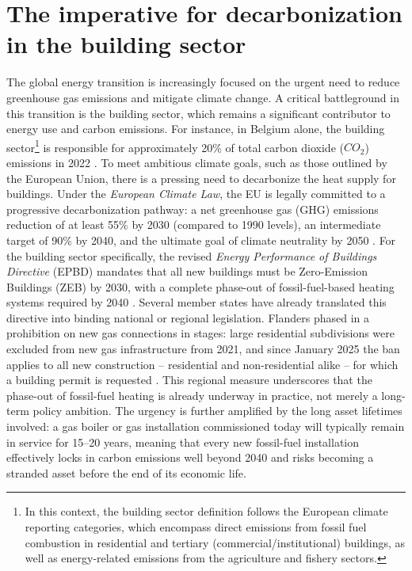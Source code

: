 \documentclass[11pt,a4paper]{report}
\begin{document}
\section{The imperative for decarbonization in the building sector}
The global energy transition is increasingly focused on the urgent need to reduce greenhouse gas emissions and mitigate climate change.
A critical battleground in this transition is the building sector, which remains a significant contributor to energy use and carbon emissions.
For instance, in Belgium alone, the building sector\footnote{In this context, the building sector definition follows the European climate reporting categories, which encompass direct emissions from fossil fuel combustion in residential and tertiary (commercial/institutional) buildings, as well as energy-related emissions from the agriculture and fishery sectors.} is responsible for approximately 20\% of total carbon dioxide ($CO_2$) emissions in 2022 \cite{EU_Climate_Action_Belgium_2023}.
To meet ambitious climate goals, such as those outlined by the European Union, there is a pressing need to decarbonize the heat supply for buildings.
Under the \textit{European Climate Law}, the EU is legally committed to a progressive decarbonization pathway: a net greenhouse gas (GHG) emissions reduction of at least 55\% by 2030 (compared to 1990 levels), an intermediate target of 90\% by 2040, and the ultimate goal of climate neutrality by 2050 \cite{EU_Climate_Law_2021, EU_2040_Target_2026}.
For the building sector specifically, the revised \textit{Energy Performance of Buildings Directive} (EPBD) mandates that all new buildings must be Zero-Emission Buildings (ZEB) by 2030, with a complete phase-out of fossil-fuel-based heating systems required by 2040 \cite{EPBD_2024}.
Several member states have already translated this directive into binding national or regional legislation.
Flanders phased in a prohibition on new gas connections in stages: large residential subdivisions were excluded from new gas infrastructure from 2021, and since January 2025 the ban applies to all new construction -- residential and non-residential alike -- for which a building permit is requested \cite{VEA_GasBoilerBan_2021}.
This regional measure underscores that the phase-out of fossil-fuel heating is already underway in practice, not merely a long-term policy ambition.
The urgency is further amplified by the long asset lifetimes involved: a gas boiler or gas installation commissioned today will typically remain in service for 15--20 years, meaning that every new fossil-fuel installation effectively locks in carbon emissions well beyond 2040 and risks becoming a stranded asset before the end of its economic life.
\end{document}
